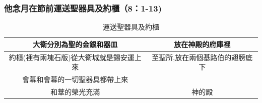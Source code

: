\documentclass{ctexart}
\begin{document}
\subsubsection{他念月在節前運送聖器具及約櫃（8：1-13)}
\begin{table}[!hbp]
\centering 
\begin{tabular}{|c|c|}
\hline
\hline
大衛分別為聖的金銀和器皿  &  放在神殿的府庫裡\\\hline
約櫃(裡有兩塊石版)從大衛城就是錫安運上來   &  至聖所,放在兩個基路伯的翅膀底下     \\\hline
會幕和會幕的一切聖器具都帶上來&     \\\hline
和華的榮光充滿&神的殿\\\hline
\end{tabular}
\caption{運送聖器具及約櫃}
\end{table}
\end{document}
